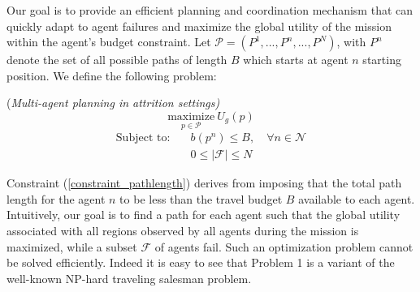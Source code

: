 Our goal is to provide an efficient planning and coordination mechanism that can quickly adapt to agent failures and maximize the global utility of the mission within the agent's budget constraint. Let $\mathcal{P} = (P^1, ..., P^n, ..., P^N)$, with $P^n$ denote the set of all possible paths of length $B$ which starts at agent $n$ starting position.
We define the following problem:

\begin{problem}\label{prob:1}(\textit{Multi-agent planning in attrition settings)}
\begin{equation}\label{eq:objectivefunction}
\underset{p \in \mathcal{P}}{\text{maximize}}\   U_g(p)
\end{equation}
	\begin{align}
           \text{Subject to:} &  \quad b(p^n)\leq B,  \quad \forall n \in \mathcal{N}   \label{constraint_pathlength} \\
           & \quad 0 \leq | \mathcal{F} | \leq N
	\end{align}
\end{problem}

Constraint (\ref{constraint_pathlength}) derives from imposing that the total path length for the agent $n$ to be less than the travel budget $B$ available to each agent. Intuitively, our goal is to find a path for each agent such that the global utility associated with all regions observed by all agents during the mission is maximized, while a subset $\mathcal{F}$ of agents fail. Such an optimization problem cannot be solved efficiently. Indeed it is easy to see that Problem 1 is a variant of the well-known NP-hard traveling salesman problem.








